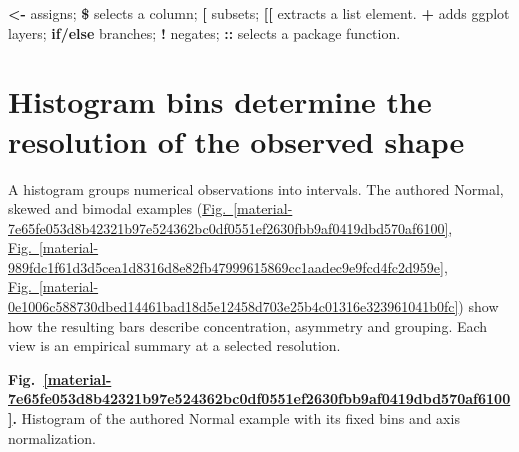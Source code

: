 \documentclass[11pt,a4paper]{article}
\begin{document}
\textbf{<-} assigns; \textbf{\$} selects a column; \textbf{[} subsets; \textbf{[[} extracts a list element. \textbf{+} adds ggplot layers; \textbf{if/else} branches; \textbf{!} negates; \textbf{::} selects a package function.

\medskip

\clearpage
\section{Histogram bins determine the resolution of the observed shape}
A histogram groups numerical observations into intervals. The authored Normal, skewed and bimodal examples (\hyperref[material-7e65fe053d8b42321b97e524362bc0df0551ef2630fbb9af0419dbd570af6100]{Fig.~\ref*{material-7e65fe053d8b42321b97e524362bc0df0551ef2630fbb9af0419dbd570af6100}}, \hyperref[material-989fdc1f61d3d5cea1d8316d8e82fb47999615869cc1aadec9e9fcd4fc2d959e]{Fig.~\ref*{material-989fdc1f61d3d5cea1d8316d8e82fb47999615869cc1aadec9e9fcd4fc2d959e}}, \hyperref[material-0e1006c588730dbed14461bad18d5e12458d703e25b4c01316e323961041b0fc]{Fig.~\ref*{material-0e1006c588730dbed14461bad18d5e12458d703e25b4c01316e323961041b0fc}}) show how the resulting bars describe concentration, asymmetry and grouping. Each view is an empirical summary at a selected resolution.


\par\medskip
\Needspace{10cm}
\label{material-7e65fe053d8b42321b97e524362bc0df0551ef2630fbb9af0419dbd570af6100}
\noindent\textbf{Fig.~\ref*{material-7e65fe053d8b42321b97e524362bc0df0551ef2630fbb9af0419dbd570af6100}.} Histogram of the authored Normal example with its fixed bins and axis normalization.\par\nopagebreak
\begin{center}
\end{center}
\end{document}
